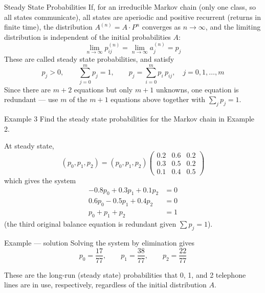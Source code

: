 \documentclass[aspectratio=169]{beamer}
\begin{document}
    \begin{frame}{Steady State Probabilities}
        If, for an irreducible Markov chain (only one class, so all states communicate), all states are aperiodic and positive recurrent (returns in finite time), the distribution $A^{(n)} = A \cdot P^n$ converges as $n \to \infty$, and the limiting distribution is independent of the initial probabilities $A$:
        \[
            \lim_{n \to \infty} p_{ij}^{(n)} = \lim_{n \to \infty} a_j^{(n)} = p_j
        \]
        These are called steady state probabilities, and satisfy
        \[
            p_j > 0, \qquad \sum_{j=0}^{m} p_j = 1, \qquad p_j = \sum_{i=0}^{m} p_i \, p_{ij}, \quad j = 0, 1, \ldots, m
        \]
        Since there are $m+2$ equations but only $m+1$ unknowns, one equation is redundant — use $m$ of the $m+1$ equations above together with $\sum_j p_j = 1$.
    \end{frame}
 
    \begin{frame}{Example 3}
        Find the steady state probabilities for the Markov chain in Example 2.
 
        At steady state,
        \[
            (p_0, p_1, p_2) = (p_0, p_1, p_2) \begin{pmatrix} 0.2 & 0.6 & 0.2 \\ 0.3 & 0.5 & 0.2 \\ 0.1 & 0.4 & 0.5 \end{pmatrix}
        \]
        which gives the system
        \[
            \begin{aligned}
                -0.8 p_0 + 0.3 p_1 + 0.1 p_2 &= 0 \\
                0.6 p_0 - 0.5 p_1 + 0.4 p_2 &= 0 \\
                p_0 + p_1 + p_2 &= 1
            \end{aligned}
        \]
        (the third original balance equation is redundant given $\sum p_j = 1$).
    \end{frame}
 
    \begin{frame}{Example --- solution}
        Solving the system by elimination gives
        \[
            p_0 = \frac{17}{77}, \qquad p_1 = \frac{38}{77}, \qquad p_2 = \frac{22}{77}
        \]
 
        These are the long-run (steady state) probabilities that 0, 1, and 2 telephone lines are in use, respectively, regardless of the initial distribution $A$.
    \end{frame}
 
\end{document}
